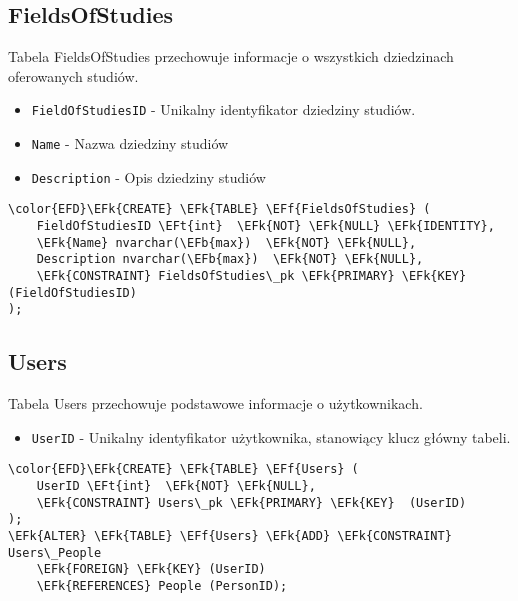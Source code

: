 \documentclass[11pt]{article}
\newcommand{\EFk}[1]{\textcolor{EFk}{\textbf{#1}}} %
\newcommand{\EFb}[1]{\textcolor{EFb}{\textbf{#1}}} %
\newcommand{\EFf}[1]{\textcolor{EFf}{#1}} %
\newcommand{\EFt}[1]{\textcolor{EFt}{\textbf{#1}}} %
\begin{document}
\subsection{FieldsOfStudies}
\label{sec:orgb95ebce}
Tabela FieldsOfStudies przechowuje informacje o wszystkich dziedzinach oferowanych studiów.
\begin{itemize}
\item \texttt{FieldOfStudiesID} - Unikalny identyfikator dziedziny studiów.
\item \texttt{Name} - Nazwa dziedziny studiów
\item \texttt{Description} - Opis dziedziny studiów
\end{itemize}
\begin{Code}
\begin{Verbatim}
\color{EFD}\EFk{CREATE} \EFk{TABLE} \EFf{FieldsOfStudies} (
    FieldOfStudiesID \EFt{int}  \EFk{NOT} \EFk{NULL} \EFk{IDENTITY},
    \EFk{Name} nvarchar(\EFb{max})  \EFk{NOT} \EFk{NULL},
    Description nvarchar(\EFb{max})  \EFk{NOT} \EFk{NULL},
    \EFk{CONSTRAINT} FieldsOfStudies\_pk \EFk{PRIMARY} \EFk{KEY}  (FieldOfStudiesID)
);
\end{Verbatim}
\end{Code}
\subsection{Users}
\label{sec:org8831d61}
Tabela Users przechowuje podstawowe informacje o użytkownikach.
\begin{itemize}
\item \texttt{UserID} - Unikalny identyfikator użytkownika, stanowiący klucz główny tabeli.
\end{itemize}
\begin{Code}
\begin{Verbatim}
\color{EFD}\EFk{CREATE} \EFk{TABLE} \EFf{Users} (
    UserID \EFt{int}  \EFk{NOT} \EFk{NULL},
    \EFk{CONSTRAINT} Users\_pk \EFk{PRIMARY} \EFk{KEY}  (UserID)
);
\EFk{ALTER} \EFk{TABLE} \EFf{Users} \EFk{ADD} \EFk{CONSTRAINT} Users\_People
    \EFk{FOREIGN} \EFk{KEY} (UserID)
    \EFk{REFERENCES} People (PersonID);
\end{Verbatim}
\end{Code}
\end{document}
